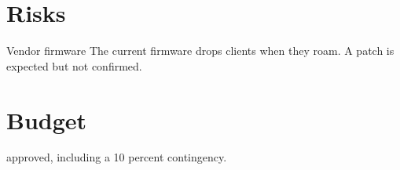 \documentclass{jupiter-report}
\begin{document}
\section{Risks}
\begin{jpcallout}[warn]{Vendor firmware}
The current firmware drops clients when they roam. A patch is expected but not confirmed.
\end{jpcallout}

\section{Budget}
 approved, including a 10 percent contingency.
\end{document}
